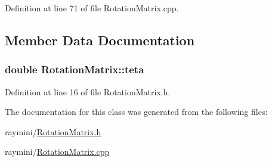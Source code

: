 Definition at line 71 of file RotationMatrix.cpp.



\subsection{Member Data Documentation}
\hypertarget{class_rotation_matrix_aec9f847b2b39893132122cc6da4d9cd7}{
\subsubsection[{teta}]{\setlength{\rightskip}{0pt plus 5cm}double {\bf RotationMatrix::teta}}}
\label{class_rotation_matrix_aec9f847b2b39893132122cc6da4d9cd7}


Definition at line 16 of file RotationMatrix.h.



The documentation for this class was generated from the following files:\begin{DoxyCompactItemize}
\item 
raymini/\hyperlink{_rotation_matrix_8h}{RotationMatrix.h}\item 
raymini/\hyperlink{_rotation_matrix_8cpp}{RotationMatrix.cpp}\end{DoxyCompactItemize}
